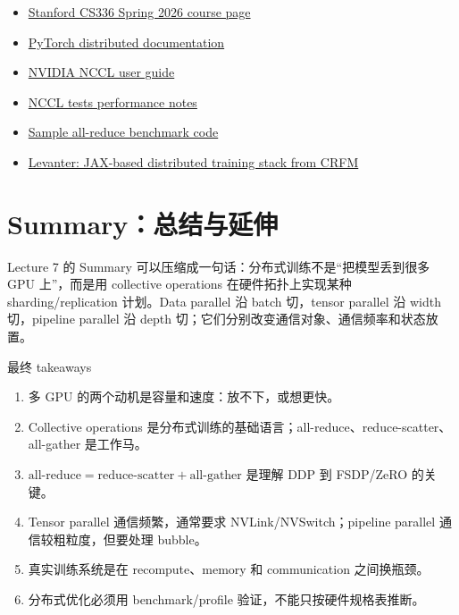 \documentclass[a4paper]{article}
\begin{document}
\begin{itemize}
    \item \href{https://cs336.stanford.edu/}{Stanford CS336 Spring 2026 course page}
    \item \href{https://pytorch.org/docs/stable/distributed.html}{PyTorch distributed documentation}
    \item \href{https://docs.nvidia.com/deeplearning/nccl/user-guide/docs/}{NVIDIA NCCL user guide}
    \item \href{https://github.com/NVIDIA/nccl-tests/blob/master/doc/PERFORMANCE.md#allreduce}{NCCL tests performance notes}
    \item \href{https://github.com/stas00/ml-engineering/blob/master/network/benchmarks/all_reduce_bench.py}{Sample all-reduce benchmark code}
    \item \href{https://crfm.stanford.edu/2023/06/16/levanter-1_0-release.html}{Levanter: JAX-based distributed training stack from CRFM}
\end{itemize}

\section{Summary：总结与延伸}

Lecture 7 的 Summary 可以压缩成一句话：分布式训练不是“把模型丢到很多 GPU 上”，而是用 collective operations 在硬件拓扑上实现某种 sharding/replication 计划。Data parallel 沿 batch 切，tensor parallel 沿 width 切，pipeline parallel 沿 depth 切；它们分别改变通信对象、通信频率和状态放置。

\begin{importantbox}{最终 takeaways}
\begin{enumerate}
    \item 多 GPU 的两个动机是容量和速度：放不下，或想更快。
    \item Collective operations 是分布式训练的基础语言；all-reduce、reduce-scatter、all-gather 是工作马。
    \item \(\text{all-reduce}=\text{reduce-scatter}+\text{all-gather}\) 是理解 DDP 到 FSDP/ZeRO 的关键。
    \item Tensor parallel 通信频繁，通常要求 NVLink/NVSwitch；pipeline parallel 通信较粗粒度，但要处理 bubble。
    \item 真实训练系统是在 recompute、memory 和 communication 之间换瓶颈。
    \item 分布式优化必须用 benchmark/profile 验证，不能只按硬件规格表推断。
\end{enumerate}
\end{importantbox}
\end{document}

